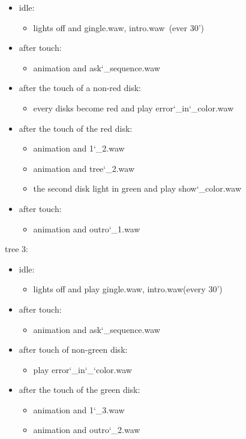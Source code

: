 \documentclass[a4paper,11pt]{report}
\begin{document}
\begin{itemize}
	\item idle:
	\begin{itemize}
		\item lights off and \lbrack gingle.waw, intro.waw\rbrack ~(ever 30')
	\end{itemize}
	\item after touch:
	\begin {itemize}
		\item animation and ask\char`_sequence.waw
	\end {itemize}
	\item after the touch of a non-red disk:
	\begin{itemize}
		\item every disks become red and play error\char`_in\char`_color.waw
	\end{itemize}
	\item after the touch of the red disk:
	\begin{itemize}
		\item animation and 1\char`_2.waw
		\item animation and tree\char`_2.waw 
		\item the second disk light in green and play show\char`_color.waw
	\end{itemize}
	\item after touch:
	\begin{itemize}
		\item animation and outro\char`_1.waw
	\end{itemize}
\end{itemize}
tree 3:
\begin{itemize}
	\item idle:
	\begin{itemize}
		\item lights off and play \lbrack gingle.waw, intro.waw\rbrack (every 30')
	\end{itemize}
	\item	after touch:
	\begin{itemize}
		\item animation and ask\char`_sequence.waw
	\end{itemize}
	\item after touch of non-green disk:
	\begin{itemize}
		\item play error\char`_in\char`_\char`color.waw 
	\end{itemize}
	\item after the touch of the green disk:
	\begin{itemize}
		\item animation and 1\char`_3.waw
		\item animation and outro\char`_2.waw
	\end{itemize}
\end {itemize}
\end{document}
